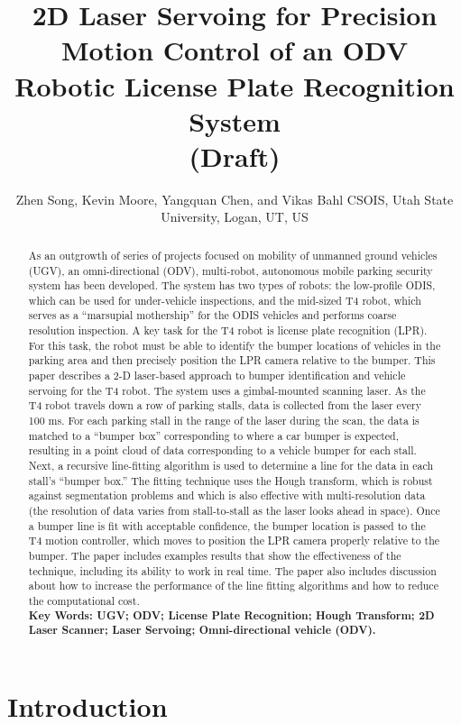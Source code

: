 \documentclass[]{spie}
\title{2D Laser Servoing for Precision Motion Control of an ODV Robotic License Plate
Recognition System\\
{\bf (Draft)} }
\author{Zhen Song\supit{a}, Kevin Moore\supit{a}, Yangquan Chen\supit{a}, and Vikas Bahl\supit{a}
\skiplinehalf
\supit{a}CSOIS, Utah State University, Logan, UT, US\com{write 4 addresses?}
}
\begin{document}
\maketitle

\begin{abstract}


As an outgrowth of series of projects focused on mobility of unmanned ground vehicles (UGV), an omni-directional (ODV), multi-robot, autonomous mobile parking security system has been developed. The system has two types of robots:  the low-profile ODIS, which can be used for under-vehicle inspections, and the mid-sized T4 robot, which serves as a ``marsupial mothership'' for the ODIS vehicles and performs coarse resolution inspection. A key task for the T4 robot is license plate recognition (LPR). For this task, the robot must be able to identify the bumper locations of vehicles in the parking area and then precisely position the LPR camera relative to the bumper. This paper describes a 2-D laser-based approach to bumper identification and vehicle servoing for the T4 robot. The system uses a gimbal-mounted scanning laser. As the T4 robot travels down a row of parking stalls, data is collected from the laser every 100 ms. For each parking stall in the range of the laser during the scan, the data is matched to a ``bumper box'' corresponding to where a car bumper is expected, resulting in a point cloud of data corresponding to a vehicle bumper for each stall. Next, a recursive line-fitting algorithm is used to determine a line for the data in each stall's ``bumper box.'' The fitting technique uses the Hough transform, which is robust against segmentation problems and which is also effective with multi-resolution data (the resolution of data varies from stall-to-stall as the laser looks ahead in space). Once a bumper line is fit with acceptable confidence, the bumper location is passed to the T4 motion controller, which moves to position the LPR camera properly relative to the bumper. The paper includes examples results that show the effectiveness of the technique, including its ability to work in real time. The paper also includes discussion about how to increase the performance of the line fitting algorithms and how to reduce the computational cost.
\\
\bf{Key Words:}
UGV;
ODV;
License Plate Recognition;
Hough Transform;
2D Laser Scanner;
Laser Servoing;
Omni-directional vehicle (ODV).

\end{abstract}
\section{Introduction}
\end{document}

